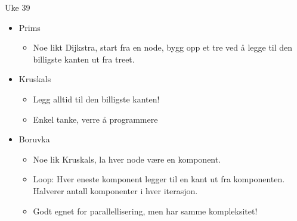 \documentclass[norsk]{beamer}
\begin{document}
	\begin{frame}{Uke 39}
		\begin{itemize}
			\item Prims
				\begin{itemize}
					\item Noe likt Dijkstra, start fra en node, bygg opp et tre ved å
						legge til den billigste kanten ut fra treet.
				\end{itemize}
			\item Kruskals
				\begin{itemize}
					\item Legg alltid til den billigste kanten!
					\item Enkel tanke, verre å programmere
				\end{itemize}
			\item Boruvka
				\begin{itemize}
					\item Noe lik Kruskals, la hver node være en komponent.
					\item Loop: Hver eneste komponent legger til en kant ut fra
						komponenten. Halverer antall komponenter i hver iterasjon.
					\item Godt egnet for parallellisering, men har samme kompleksitet!
				\end{itemize}
		\end{itemize}
	\end{frame}
\end{document}

